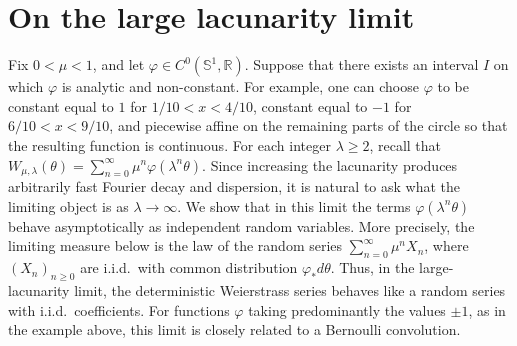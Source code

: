\documentclass[11pt]{amsart}
\theoremstyle{plain}
\newtheorem{corollary}[theorem]{Corollary}
\theoremstyle{definition}
\numberwithin{equation}{section}
\begin{document}

\section{On the large lacunarity limit} \label{ap:large-lacunarity}

Fix $0<\mu<1$, and let $\varphi\in C^0(\mathbb S^1,\mathbb R)$. Suppose that there exists an interval $I$ on which $\varphi$ is analytic and non-constant. For example, one can choose $\varphi$ to be constant equal to $1$ for $1/10<x<4/10$, constant equal to $-1$ for $6/10<x<9/10$, and piecewise affine on the remaining parts of the circle so that the resulting function is continuous. For each integer $\lambda\geq2$, recall that $W_{\mu,\lambda}(\theta)=\sum_{n=0}^\infty\mu^n\varphi(\lambda^n\theta)$. Since increasing the lacunarity produces arbitrarily fast Fourier decay and dispersion, it is natural to ask what the limiting object is as $\lambda\to\infty$. We show that in this limit the terms $\varphi(\lambda^n\theta)$ behave asymptotically as independent random variables. More precisely, the limiting measure below is the law of the random series $\sum_{n=0}^\infty\mu^nX_n$, where $(X_n)_{n\geq0}$ are i.i.d.\ with common distribution $\varphi_*d\theta$. Thus, in the large-lacunarity limit, the deterministic Weierstrass series behaves like a random series with i.i.d.\ coefficients. For functions $\varphi$ taking predominantly the values $\pm1$, as in the example above, this limit is closely related to a Bernoulli convolution.
\end{document}
